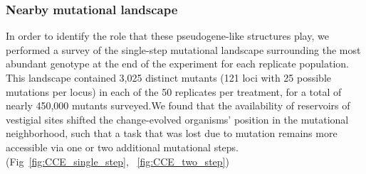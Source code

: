 \documentclass[PhD]{msu-thesis}
\begin{document}
\subsubsection{Nearby mutational landscape}

In order to identify the role that these pseudogene-like structures play, we performed a survey of the single-step mutational landscape surrounding the most abundant genotype at the end of the experiment for each replicate population. This landscape contained 3,025 distinct mutants (121 loci with 25 possible mutations per locus) in each of the 50 replicates per treatment, for a total of nearly 450,000 mutants surveyed.We found that the availability of reservoirs of vestigial sites shifted the change-evolved organisms' position in the mutational neighborhood, such that a task that was lost due to mutation remains more accessible via one or two additional mutational steps. (Fig~\ref{fig:CCE_single_step}, ~\ref{fig:CCE_two_step})
\end{document}
